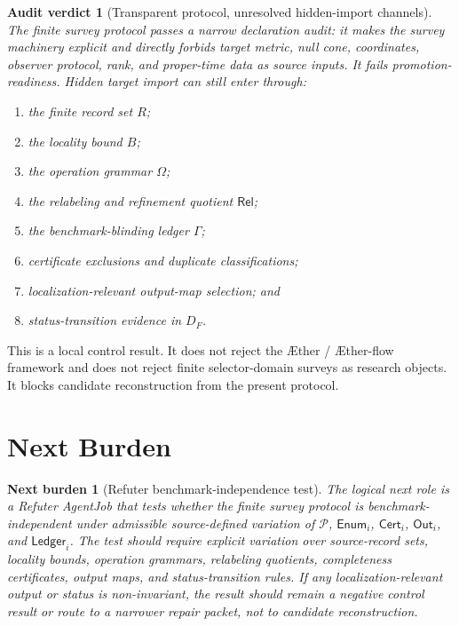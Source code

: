 \documentclass[11pt]{article}
\newcommand{\Aether}{\AE{}ther}
\newcommand{\Aflow}{\AE{}ther-flow}
\newcommand{\TheoryProgram}{\Aether{} / \Aflow{} framework}
\newcommand{\Pack}{\mathcal{P}}
\newcommand{\Enum}{\mathsf{Enum}}
\newcommand{\Cert}{\mathsf{Cert}}
\newcommand{\Out}{\mathsf{Out}}
\newcommand{\Ledger}{\mathsf{Ledger}}
\newcommand{\Rel}{\mathsf{Rel}}
\newtheorem{auditverdict}{Audit verdict}
\newtheorem{nextburden}{Next burden}
\begin{document}
\begin{auditverdict}[Transparent protocol, unresolved hidden-import channels]
The finite survey protocol passes a narrow declaration audit: it makes the
survey machinery explicit and directly forbids target metric, null cone,
coordinates, observer protocol, rank, and proper-time data as source inputs.
It fails promotion-readiness. Hidden target import can still enter through:
\begin{enumerate}
    \item the finite record set \(R\);
    \item the locality bound \(B\);
    \item the operation grammar \(\Omega\);
    \item the relabeling and refinement quotient \(\Rel\);
    \item the benchmark-blinding ledger \(\Gamma\);
    \item certificate exclusions and duplicate classifications;
    \item localization-relevant output-map selection; and
    \item status-transition evidence in \(D_F\).
\end{enumerate}
\end{auditverdict}

This is a local control result. It does not reject the \TheoryProgram{} and
does not reject finite selector-domain surveys as research objects. It
blocks candidate reconstruction from the present protocol.

\section{Next Burden}

\begin{nextburden}[Refuter benchmark-independence test]
The logical next role is a Refuter AgentJob that tests whether the finite
survey protocol is benchmark-independent under admissible source-defined
variation of \(\Pack\), \(\Enum_i\), \(\Cert_i\), \(\Out_i\), and
\(\Ledger_i\). The test should require explicit variation over source-record
sets, locality bounds, operation grammars, relabeling quotients, completeness
certificates, output maps, and status-transition rules. If any
localization-relevant output or status is non-invariant, the result should
remain a negative control result or route to a narrower repair packet, not to
candidate reconstruction.
\end{nextburden}
\end{document}
